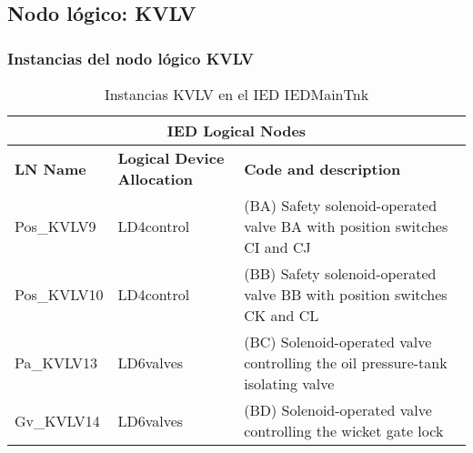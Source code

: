 
\subsection{Nodo l\'ogico: 			 KVLV}

    \subsubsection{Instancias del nodo l\'ogico KVLV}
    \begin{table}[H]
    \begin{center}
    \begin{tabular}{|l|l|p{6.8cm}|}
            \hline
            \multicolumn{3}{|c|}{\cellcolor[gray]{0.8} \textbf{IED Logical Nodes} } \\
            \hline
            \textbf{LN Name} & \textbf{Logical Device Allocation} & \textbf{Code and description} \\
            \hline
            Pos\_KVLV9 & LD4control & (BA) Safety solenoid-operated valve BA with position switches CI and CJ \\
            \hline
            Pos\_KVLV10 & LD4control & (BB) Safety solenoid-operated valve BB with position switches CK and CL \\
            \hline
            Pa\_KVLV13 & LD6valves & (BC) Solenoid-operated valve controlling the oil pressure-tank isolating valve \\
            \hline
            Gv\_KVLV14 & LD6valves & (BD) Solenoid-operated valve controlling the wicket gate lock \\
            \hline
    \end{tabular}
    \caption{Instancias KVLV en el IED IEDMainTnk}
    \label{table:lnInstKVLV_solenoid_operated}
    \end{center}
    \end{table}
    
    
    
